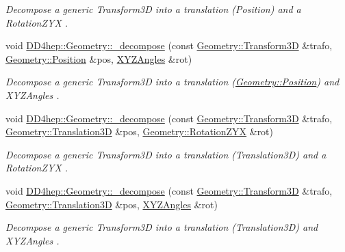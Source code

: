 \begin{DoxyCompactItemize}
\begin{DoxyCompactList}\small\item\em Decompose a generic Transform3D into a translation (Position) and a Rotation\+Z\+YX . \end{DoxyCompactList}\item 
void \hyperlink{group___d_d4_h_e_p___g_e_o_m_e_t_r_y_gad0cc5511671f40c3394c8688e7a2316f}{D\+D4hep\+::\+Geometry\+::\+\_\+decompose} (const \hyperlink{namespace_d_d4hep_1_1_geometry_aeb4c0356d12fd7be49a0aae50514e64b}{Geometry\+::\+Transform3D} \&trafo, \hyperlink{namespace_d_d4hep_1_1_geometry_a55083902099d03506c6db01b80404900}{Geometry\+::\+Position} \&pos, \hyperlink{namespace_d_d4hep_1_1_geometry_ab195c63789d4928d291d3b5522151aaa}{X\+Y\+Z\+Angles} \&rot)
\begin{DoxyCompactList}\small\item\em Decompose a generic Transform3D into a translation (\hyperlink{namespace_d_d4hep_1_1_geometry_a55083902099d03506c6db01b80404900}{Geometry\+::\+Position}) and X\+Y\+Z\+Angles . \end{DoxyCompactList}\item 
void \hyperlink{group___d_d4_h_e_p___g_e_o_m_e_t_r_y_ga46814636f071d07ca4567f3244884664}{D\+D4hep\+::\+Geometry\+::\+\_\+decompose} (const \hyperlink{namespace_d_d4hep_1_1_geometry_aeb4c0356d12fd7be49a0aae50514e64b}{Geometry\+::\+Transform3D} \&trafo, \hyperlink{namespace_d_d4hep_1_1_geometry_ab90afde486c9b46f4fa91bc659271b99}{Geometry\+::\+Translation3D} \&pos, \hyperlink{namespace_d_d4hep_1_1_geometry_a24667b2b9c3cec3d5239828db4d52189}{Geometry\+::\+Rotation\+Z\+YX} \&rot)
\begin{DoxyCompactList}\small\item\em Decompose a generic Transform3D into a translation (Translation3D) and a Rotation\+Z\+YX . \end{DoxyCompactList}\item 
void \hyperlink{group___d_d4_h_e_p___g_e_o_m_e_t_r_y_gafde0308d492794fe4b55f66247921482}{D\+D4hep\+::\+Geometry\+::\+\_\+decompose} (const \hyperlink{namespace_d_d4hep_1_1_geometry_aeb4c0356d12fd7be49a0aae50514e64b}{Geometry\+::\+Transform3D} \&trafo, \hyperlink{namespace_d_d4hep_1_1_geometry_ab90afde486c9b46f4fa91bc659271b99}{Geometry\+::\+Translation3D} \&pos, \hyperlink{namespace_d_d4hep_1_1_geometry_ab195c63789d4928d291d3b5522151aaa}{X\+Y\+Z\+Angles} \&rot)
\begin{DoxyCompactList}\small\item\em Decompose a generic Transform3D into a translation (Translation3D) and X\+Y\+Z\+Angles . \end{DoxyCompactList}\item 

\end{DoxyCompactItemize}
